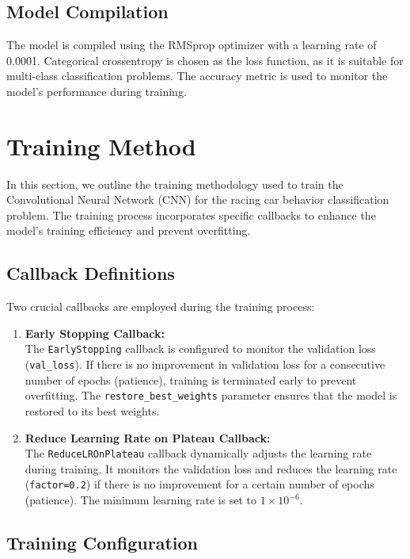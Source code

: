 \documentclass{article}
\begin{document}
\subsection{Model Compilation}

The model is compiled using the RMSprop optimizer with a learning rate of 0.0001. Categorical crossentropy is chosen as the loss function, as it is suitable for multi-class classification problems. The accuracy metric is used to monitor the model's performance during training.

\section{Training Method}

In this section, we outline the training methodology used to train the Convolutional Neural Network (CNN) for the racing car behavior classification problem. The training process incorporates specific callbacks to enhance the model's training efficiency and prevent overfitting.

\subsection{Callback Definitions}

Two crucial callbacks are employed during the training process:

\begin{enumerate}
    \item \textbf{Early Stopping Callback:} \\
          The \texttt{EarlyStopping} callback is configured to monitor the validation loss (\texttt{val\_loss}). If there is no improvement in validation loss for a consecutive number of epochs (patience), training is terminated early to prevent overfitting. The \texttt{restore\_best\_weights} parameter ensures that the model is restored to its best weights.

    \item \textbf{Reduce Learning Rate on Plateau Callback:} \\
          The \texttt{ReduceLROnPlateau} callback dynamically adjusts the learning rate during training. It monitors the validation loss and reduces the learning rate (\texttt{factor=0.2}) if there is no improvement for a certain number of epochs (patience). The minimum learning rate is set to \(1 \times 10^{-6}\).
\end{enumerate}

\subsection{Training Configuration}
\end{document}
